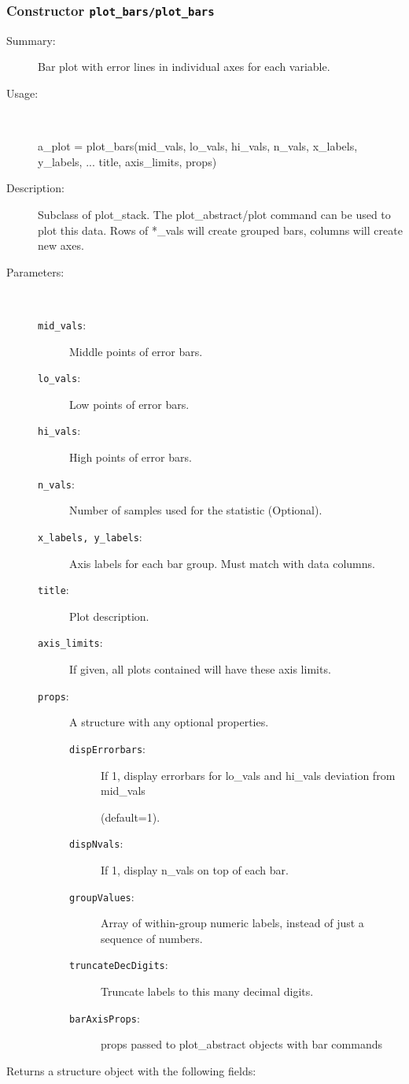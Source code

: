 \subsubsection[Constructor \texttt{plot\_bars}]{Constructor \texttt{plot\_bars/plot\_bars}}%
%
\label{ref_plot_bars__plot_bars}%
\hypertarget{ref_plot_bars__plot_bars}{}%
\begin{description}
\item[Summary:]Bar plot with error lines in individual axes for each variable.
%
\item[Usage:]~%
\begin{lyxcode}%
a\_plot = plot\_bars(mid\_vals, lo\_vals, hi\_vals, n\_vals, x\_labels, y\_labels, ...
		     title, axis\_limits, props)
%
\end{lyxcode}%
%
\item[Description:]%
Subclass of plot\_stack. The plot\_abstract/plot command can be used to
 plot this data. Rows of *\_vals will create grouped bars, columns will
 create new axes.
\item[Parameters:]~
\begin{description}%
\item[\texttt{mid\_vals}:]
 Middle points of error bars.
\item[\texttt{lo\_vals}:]
 Low points of error bars.
\item[\texttt{hi\_vals}:]
 High points of error bars.
\item[\texttt{n\_vals}:]
 Number of samples used for the statistic (Optional).
\item[\texttt{x\_labels, y\_labels}:]
 Axis labels for each bar group. Must match with data columns.
\item[\texttt{title}:]
 Plot description.
\item[\texttt{axis\_limits}:]
 If given, all plots contained will have these axis limits.
\item[\texttt{props}:]
 A structure with any optional properties.
\begin{description}%
\item[\texttt{dispErrorbars}:]
 If 1, display errorbars for lo\_vals and hi\_vals deviation from mid\_vals 

(default=1).\item[\texttt{dispNvals}:]
 If 1, display n\_vals on top of each bar.
\item[\texttt{groupValues}:]
 Array of within-group numeric labels, instead of just a sequence of numbers.
\item[\texttt{truncateDecDigits}:]
 Truncate labels to this many decimal digits.
\item[\texttt{barAxisProps}:]
 props passed to plot\_abstract objects with bar commands
\end{description}%
\end{description}%
%
\item[Returns a structure object with the following fields:]~


\end{description}
